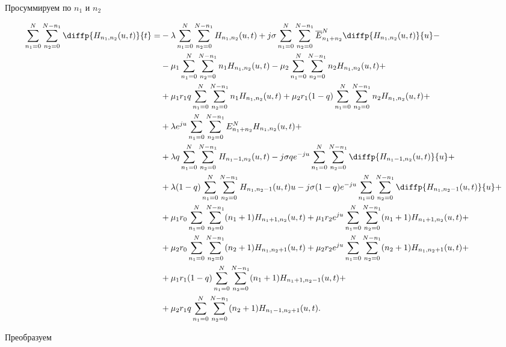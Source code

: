 Просуммируем по $n_{1}$ и $n_{2}$

\begin{equation*}
\begin{aligned}
	\sum_{n_1=0}^N \sum_{n_2=0}^{N-n_1}\diffp{H_{n_1,n_2}(u,t)}{t}=
	&-\lambda \sum_{n_1=0}^N\sum_{n_2=0}^{N-n_1}
	H_{n_1, n_2}(u,t)
	+j\sigma \sum_{n_1=0}^N\sum_{n_2=0}^{N-n_1}
	\overline{E}^N_{n_1+n_2}\diffp{H_{n_1, n_2}(u,t)}{u}-\\
	&-\mu_1 \sum_{n_1=0}^N\sum_{n_2=0}^{N-n_1}
	n_1 H_{n_1, n_2}(u,t)
	-\mu_2 \sum_{n_1=0}^N\sum_{n_2=0}^{N-n_1}
	n_2 H_{n_1, n_2}(u,t)+\\
	&+\mu_1 r_1 q \sum_{n_1=0}^N\sum_{n_2=0}^{N-n_1}
	n_1 H_{n_1, n_2}(u,t)
	+\mu_2 r_1 (1-q)\sum_{n_1=0}^N\sum_{n_2=0}^{N-n_1} 
	n_2 H_{n_1, n_2}(u,t)+\\
	&+\lambda e^{ju}\sum_{n_1=0}^N\sum_{n_2=0}^{N-n_1}
	E^N_{n_1+n_2}H_{n_1, n_2}(u,t)+\\
	&+\lambda q \sum_{n_1=0}^N\sum_{n_2=0}^{N-n_1}
	H_{n_1-1, n_2}(u,t)
	-j \sigma q e^{-ju}\sum_{n_1=0}^N\sum_{n_2=0}^{N-n_1}
	\diffp{H_{n_1-1, n_2}(u,t)}{u}+\\
	&+\lambda (1-q) \sum_{n_1=0}^N\sum_{n_2=0}^{N-n_1}
	H_{n_1, n_2-1}(u,t){u}
	-j \sigma (1-q) e^{-ju}\sum_{n_1=0}^N\sum_{n_2=0}^{N-n_1}
	\diffp{H_{n_1, n_2-1}(u,t)}{u}+\\
	&+\mu_1 r_0 \sum_{n_1=0}^N\sum_{n_2=0}^{N-n_1}
	(n_1+1) H_{n_1+1, n_2}(u,t)
	+\mu_1 r_2 e^{ju} \sum_{n_1=0}^N\sum_{n_2=0}^{N-n_1}
	(n_1+1) H_{n_1+1, n_2}(u,t)+\\
	&+\mu_2 r_0 \sum_{n_1=0}^N\sum_{n_2=0}^{N-n_1}
	(n_2+1) H_{n_1, n_2+1}(u,t)
	+\mu_2 r_2 e^{ju} \sum_{n_1=0}^N\sum_{n_2=0}^{N-n_1}
	(n_2+1) H_{n_1, n_2+1}(u,t)+\\
	&+\mu_1 r_1 (1-q) \sum_{n_1=0}^N\sum_{n_2=0}^{N-n_1}
	(n_1+1)H_{n_1+1, n_2-1}(u,t)+\\
	&+\mu_2 r_1 q \sum_{n_1=0}^N\sum_{n_2=0}^{N-n_1}
	(n_2+1)H_{n_1-1, n_2+1}(u,t).\\	
\end{aligned}
\end{equation*}

Преобразуем

